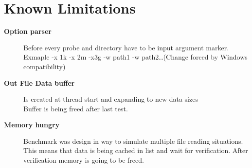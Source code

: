 \hypertarget{KnownIssues}{
\section{Known Limitations}
\label{KnownLimitations}
}

\begin{description}
\item [\textbf{Option parser}] Before every probe and directory have to be input argument marker.\\Exmaple -x 1k -x 2m -x3g -w path1 -w path2\ldots (Change forced by Windows compatibility)
\item [\textbf{Out File Data buffer}] Is created at thread start and expanding to new data sizes\\ Buffer is being freed after last test.
\item [\textbf{Memory hungry} ] Benchmark was design in way to simulate multiple file reading situations.\\
This means that data is being cached in list and wait for verification. After verification memory is going to be freed.
\end{description}
